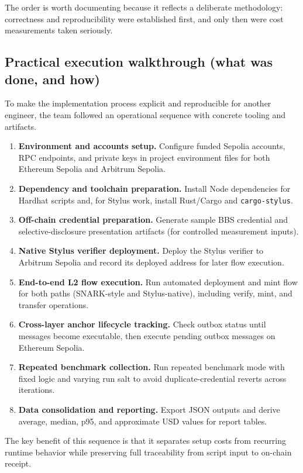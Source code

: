 \documentclass[11pt]{article}
\begin{document}
The order is worth documenting because it reflects a deliberate methodology: correctness and reproducibility were established first, and only then were cost measurements taken seriously.

\subsection{Practical execution walkthrough (what was done, and how)}
To make the implementation process explicit and reproducible for another engineer, the team followed an operational sequence with concrete tooling and artifacts.

\begin{enumerate}
  \item \textbf{Environment and accounts setup.} Configure funded Sepolia accounts, RPC endpoints, and private keys in project environment files for both Ethereum Sepolia and Arbitrum Sepolia.
  \item \textbf{Dependency and toolchain preparation.} Install Node dependencies for Hardhat scripts and, for Stylus work, install Rust/Cargo and \texttt{cargo-stylus}.
  \item \textbf{Off-chain credential preparation.} Generate sample BBS credential and selective-disclosure presentation artifacts (for controlled measurement inputs).
  \item \textbf{Native Stylus verifier deployment.} Deploy the Stylus verifier to Arbitrum Sepolia and record its deployed address for later flow execution.
  \item \textbf{End-to-end L2 flow execution.} Run automated deployment and mint flow for both paths (SNARK-style and Stylus-native), including verify, mint, and transfer operations.
  \item \textbf{Cross-layer anchor lifecycle tracking.} Check outbox status until messages become executable, then execute pending outbox messages on Ethereum Sepolia.
  \item \textbf{Repeated benchmark collection.} Run repeated benchmark mode with fixed logic and varying run salt to avoid duplicate-credential reverts across iterations.
  \item \textbf{Data consolidation and reporting.} Export JSON outputs and derive average, median, p95, and approximate USD values for report tables.
\end{enumerate}

The key benefit of this sequence is that it separates setup costs from recurring runtime behavior while preserving full traceability from script input to on-chain receipt.
\end{document}
